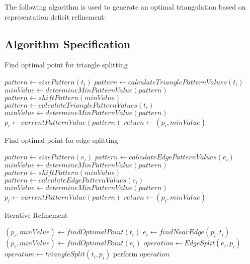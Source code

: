 The following algorithm is used to generate an optimal triangulation
based on representation deficit refinement:

\subsection{Algorithm Specification}
\begin{algorithm}[H]
\begin{algorithmic}
\caption{Find optimal point for triangle splitting}
 
  \State $pattern \gets sizePattern\left( t_i \right)$
  \State $pattern \gets calculateTrianglePatternValues\left( t_i \right)$
  \State $minValue \gets determineMinPatternValue\left( pattern \right)$
    \State $pattern \gets shiftPattern\left( minValue \right)$
    \State $pattern \gets calculateTrianglePatternValues\left( t_i \right)$
    \State $minValue \gets determineMinPatternValue\left( pattern \right)$
  \EndWhile
  \State $p_i \gets currentPatternValue\left( pattern \right)$
  \State $return \gets \left( p_i, minValue \right)$
\EndProcedure
\end{algorithmic}
\end{algorithm}

\begin{algorithm}[H]
\begin{algorithmic}
\caption{Find optimal point for edge splitting}
 
  \State $pattern \gets sizePattern\left( e_i \right)$
  \State $pattern \gets calculateEdgePatternValues\left( e_i \right)$
  \State $minValue \gets determineMinPatternValue\left( pattern \right)$
    \State $pattern \gets shiftPattern\left( minValue \right)$
    \State $pattern \gets calculateEdgePatternValues\left( e_i \right)$
    \State $minValue \gets determineMinPatternValue\left( pattern \right)$
  \EndWhile
  \State $p_i \gets currentPatternValue\left( pattern \right)$
  \State $return \gets \left( p_i, minValue \right)$
\EndProcedure
\end{algorithmic}
\end{algorithm}

\begin{algorithm}[H]
\caption{Iterative Refinement}
\label{alg_IterativeRefinement}
\begin{algorithmic}
 
    \State $\left( p_i, minValue \right) \gets findOptimalPoint\left( t_i \right)$
      \State $e_i \gets findNearEdge\left( p_i, t_i \right)$
      \State $\left( p_i, minValue \right) \gets findOptimalPoint\left( e_i \right)$
      \State $operation \gets EdgeSplit\left( e_i, p_i \right)$
    \Else
      \State $operation \gets triangleSplit\left( t_i, p_i \right)$
    \EndIf
      \State perform $operation$
    \EndIf
  \EndFor
\EndProcedure
\end{algorithmic}
\end{algorithm}

